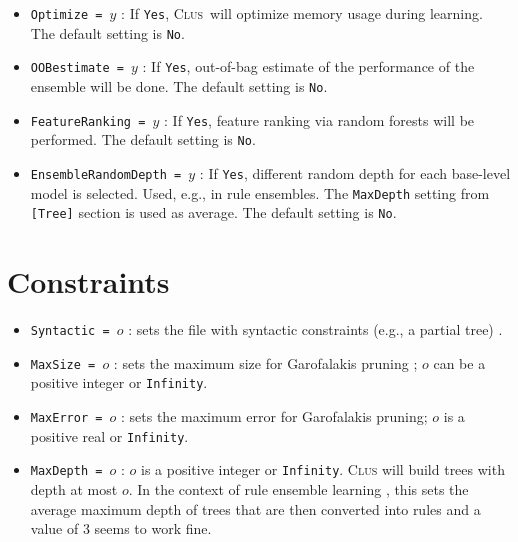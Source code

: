 \documentclass[a4paper]{report}
\newcommand{\clus}{\textsc{Clus}}
\begin{document}
\begin{itemize}
	\item {\tt Optimize = $y$} : If \texttt{Yes}, \clus\ will optimize memory usage during learning. The default setting is \texttt{No}.
	\item {\tt OOBestimate = $y$} : If \texttt{Yes}, out-of-bag estimate of the performance of the ensemble will be done. The default setting is \texttt{No}.
	\item {\tt FeatureRanking = $y$} : If \texttt{Yes}, feature ranking via random forests will be performed. The default setting is \texttt{No}.
	\item {\tt EnsembleRandomDepth = $y$} : If \texttt{Yes}, different random depth for each base-level model is selected. Used, e.g., in rule ensembles. The \texttt{MaxDepth} setting from \texttt{[Tree]} section is used as average. The default setting is \texttt{No}.
	
	 
\end{itemize}

\section{Constraints}

\begin{itemize}
\item {\tt Syntactic = $o$} : sets the file with syntactic constraints (e.g., a partial tree) \cite{Struyf06-KDID:proc}.
\item {\tt MaxSize = $o$} : sets the maximum size for Garofalakis pruning \cite{Garofalakis03:jrnl, Struyf06-KDID:proc}; $o$ can be a positive integer or {\tt Infinity}.
\item {\tt MaxError = $o$} : sets the maximum error for Garofalakis pruning; $o$ is a positive real or {\tt Infinity}.
\item {\tt MaxDepth = $o$} : $o$ is a positive integer or {\tt Infinity}. \clus{} will build trees with depth at most $o$. In the context of rule ensemble learning \cite{Aho2009}, this sets the average maximum depth of trees that are then converted into rules and a value of 3 seems to work fine.
\end{itemize}
\end{document}
